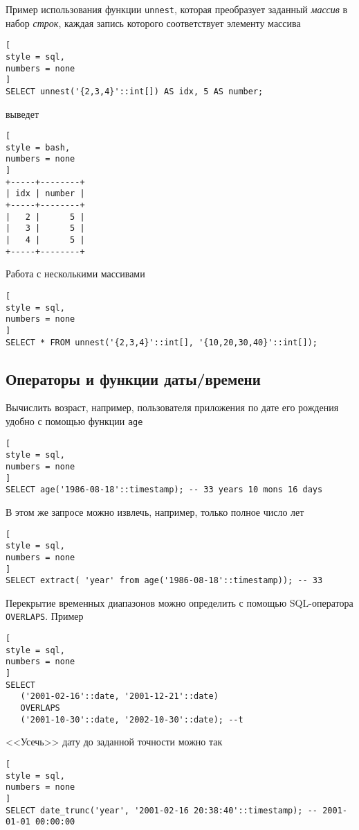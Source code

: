 \documentclass[%
	11pt,
	a4paper,
	utf8,
		]{article}
\begin{document}
Пример использования функции \texttt{unnest}, которая преобразует заданный \emph{массив} в набор \emph{строк}, каждая запись которого соответствует элементу массива
\begin{lstlisting}[
style = sql,
numbers = none
]
SELECT unnest('{2,3,4}'::int[]) AS idx, 5 AS number;
\end{lstlisting}
выведет
\begin{lstlisting}[
style = bash,
numbers = none
]
+-----+--------+
| idx | number |
+-----+--------+
|   2 |      5 |
|   3 |      5 |
|   4 |      5 |
+-----+--------+
\end{lstlisting}

Работа с несколькими массивами
\begin{lstlisting}[
style = sql,
numbers = none
]
SELECT * FROM unnest('{2,3,4}'::int[], '{10,20,30,40}'::int[]);
\end{lstlisting}


\subsection{Операторы и функции даты/времени}

Вычислить возраст, например, пользователя приложения по дате его рождения удобно с помощью функции \texttt{age}
\begin{lstlisting}[
style = sql,
numbers = none
]
SELECT age('1986-08-18'::timestamp); -- 33 years 10 mons 16 days
\end{lstlisting}

В этом же запросе можно извлечь, например, только полное число лет
\begin{lstlisting}[
style = sql,
numbers = none
]
SELECT extract( 'year' from age('1986-08-18'::timestamp)); -- 33
\end{lstlisting}

Перекрытие временных диапазонов можно определить с помощью SQL-оператора \texttt{OVERLAPS}. Пример
\begin{lstlisting}[
style = sql,
numbers = none
]
SELECT
   ('2001-02-16'::date, '2001-12-21'::date)
   OVERLAPS
   ('2001-10-30'::date, '2002-10-30'::date); --t
\end{lstlisting}

<<Усечь>> дату до заданной точности можно так
\begin{lstlisting}[
style = sql,
numbers = none
]
SELECT date_trunc('year', '2001-02-16 20:38:40'::timestamp); -- 2001-01-01 00:00:00
\end{lstlisting}
\end{document}

